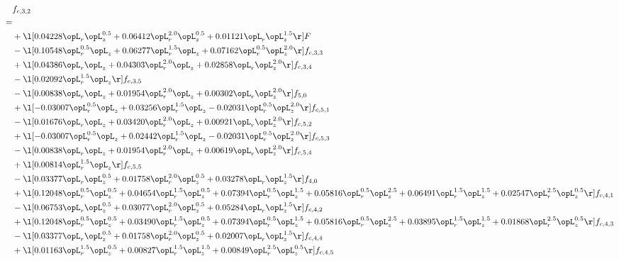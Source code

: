 \begin{alignat}{2} 
\label{eq:f_32_2} 
& f_{c,3,2} \nonumber \\ 
 = \\ 
& + \l[  0.04228 \opL_r \opL_z^{0.5} +  0.06412 \opL_r^{2.0} \opL_z^{0.5} +  0.01121 \opL_r \opL_z^{1.5}  \r] F \nonumber \\ 
& - \l[  0.10548 \opL_r^{0.5} \opL_z +  0.06277 \opL_r^{1.5} \opL_z +  0.07162 \opL_r^{0.5} \opL_z^{2.0}  \r] f_{c,3,3} \nonumber \\ 
& + \l[  0.04386 \opL_r \opL_z +  0.04303 \opL_r^{2.0} \opL_z +  0.02858 \opL_r \opL_z^{2.0}  \r] f_{c,3,4} \nonumber \\ 
& - \l[  0.02092 \opL_r^{1.5} \opL_z  \r] f_{c,3,5} \nonumber \\ 
& - \l[  0.00838 \opL_r \opL_z +  0.01954 \opL_r^{2.0} \opL_z +  0.00302 \opL_r \opL_z^{2.0}  \r] f_{5,0} \nonumber \\ 
& + \l[  -0.03007 \opL_r^{0.5} \opL_z +  0.03256 \opL_r^{1.5} \opL_z   -0.02031 \opL_r^{0.5} \opL_z^{2.0}  \r] f_{c,5,1} \nonumber \\ 
& - \l[  0.01676 \opL_r \opL_z +  0.03420 \opL_r^{2.0} \opL_z +  0.00921 \opL_r \opL_z^{2.0}  \r] f_{c,5,2} \nonumber \\ 
& + \l[  -0.03007 \opL_r^{0.5} \opL_z +  0.02442 \opL_r^{1.5} \opL_z   -0.02031 \opL_r^{0.5} \opL_z^{2.0}  \r] f_{c,5,3} \nonumber \\ 
& - \l[  0.00838 \opL_r \opL_z +  0.01954 \opL_r^{2.0} \opL_z +  0.00619 \opL_r \opL_z^{2.0}  \r] f_{c,5,4} \nonumber \\ 
& + \l[  0.00814 \opL_r^{1.5} \opL_z  \r] f_{c,5,5} \nonumber \\ 
& - \l[  0.03377 \opL_r \opL_z^{0.5} +  0.01758 \opL_r^{2.0} \opL_z^{0.5} +  0.03278 \opL_r \opL_z^{1.5}  \r] f_{4,0} \nonumber \\ 
& + \l[  0.12048 \opL_r^{0.5} \opL_z^{0.5} +  0.04654 \opL_r^{1.5} \opL_z^{0.5} +  0.07394 \opL_r^{0.5} \opL_z^{1.5} +  0.05816 \opL_r^{0.5} \opL_z^{2.5} +  0.06491 \opL_r^{1.5} \opL_z^{1.5} +  0.02547 \opL_r^{2.5} \opL_z^{0.5}  \r] f_{c,4,1} \nonumber \\ 
& - \l[  0.06753 \opL_r \opL_z^{0.5} +  0.03077 \opL_r^{2.0} \opL_z^{0.5} +  0.05284 \opL_r \opL_z^{1.5}  \r] f_{c,4,2} \nonumber \\ 
& + \l[  0.12048 \opL_r^{0.5} \opL_z^{0.5} +  0.03490 \opL_r^{1.5} \opL_z^{0.5} +  0.07394 \opL_r^{0.5} \opL_z^{1.5} +  0.05816 \opL_r^{0.5} \opL_z^{2.5} +  0.03895 \opL_r^{1.5} \opL_z^{1.5} +  0.01868 \opL_r^{2.5} \opL_z^{0.5}  \r] f_{c,4,3} \nonumber \\ 
& - \l[  0.03377 \opL_r \opL_z^{0.5} +  0.01758 \opL_r^{2.0} \opL_z^{0.5} +  0.02007 \opL_r \opL_z^{1.5}  \r] f_{c,4,4} \nonumber \\ 
& + \l[  0.01163 \opL_r^{1.5} \opL_z^{0.5} +  0.00827 \opL_r^{1.5} \opL_z^{1.5} +  0.00849 \opL_r^{2.5} \opL_z^{0.5}  \r] f_{c,4,5} \nonumber \\ 
\end{alignat} 


